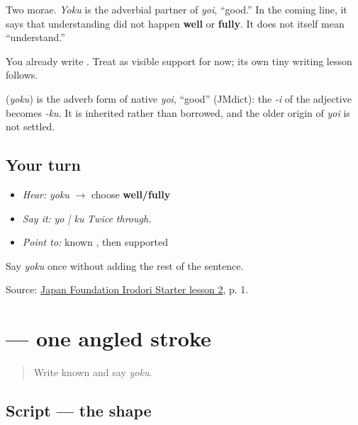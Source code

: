 Two morae. \emph{Yoku} is the adverbial partner of \emph{yoi}, “good.” In the coming line, it says that understanding did not happen \textbf{well} or \textbf{fully}. It does not itself mean “understand.”

You already write \textbf{}. Treat \textbf{} as visible support for now; its own tiny writing lesson follows.

\begin{cousinweb}
\textbf{} (\emph{yoku}) is the adverb form of native \emph{yoi}, \textquotedblleft{}good\textquotedblright{} (JMdict): the \emph{-i} of the adjective becomes \emph{-ku}. It is inherited rather than borrowed, and the older origin of \emph{yoi} is not settled.
\end{cousinweb}

\subsection*{Your turn}
\begin{itemize}
\raggedright
  \item \emph{Hear:} \emph{yoku} $\to$ choose \textbf{well/fully}
  \item \emph{Say it:} \emph{yo | ku} \emph{Twice through.}
  \item \emph{Point to:} known \textbf{}, then supported \textbf{}
\end{itemize}

\begin{tcolorbox}[breakable,colback=teal!4,colframe=teal!35!black,title={Before you move on}]
Say \emph{yoku} once without adding the rest of the sentence.

Source: \href{https://www.irodori.jpf.go.jp/assets/data/starter/pdf/X\_L02.pdf}{Japan Foundation Irodori Starter lesson 2}, p. 1.
\end{tcolorbox}
\section[\texorpdfstring{\ja{く} (ku)}{く (ku)}]{ — one angled stroke}

\label{lesson:JA-W09-ku}



\begin{quote}
Write known \textbf{} and say \emph{yoku}.
\end{quote}

\subsection*{Script — the shape}

